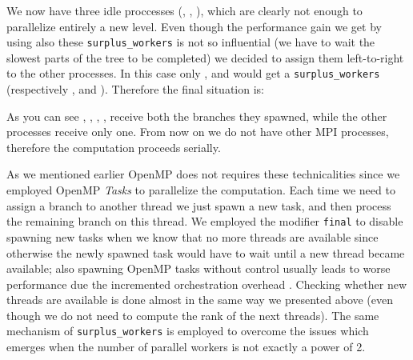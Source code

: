\documentclass{article}
\begin{document}
We now have three idle proccesses (, , ), which are
clearly not enough to parallelize entirely a new level. Even though the
performance gain we get by using also these \texttt{surplus\_workers} is not
so influential (we have to wait the slowest parts of the tree to be completed)
we decided to assign them left-to-right to the other processes. In this case
only ,  and  would get a \texttt{surplus\_workers}
(respectively ,  and ). Therefore the final situation
is:

\begin{figure}[H]
    \centering
\end{figure}

As you can see , , , ,  receive both the
branches they spawned, while the other processes receive only one. From now on
we do not have other MPI processes, therefore the computation proceeds serially.

As we mentioned earlier OpenMP does not requires these technicalities since we
employed OpenMP \emph{Tasks} to parallelize the computation. Each time we need
to assign a branch to another thread we just spawn a new task, and then process
the remaining branch on this thread. We employed the modifier \texttt{final}
to disable spawning new tasks when we know that no more threads are available
since otherwise the newly spawned task would have to wait until a new thread
became available; also spawning OpenMP tasks without control usually leads to
worse performance due the incremented orchestration overhead
\cite{hager2010introduction}. Checking whether new threads are available is done
almost in the same way we presented above (even though we do not need to compute
the rank of the next threads). The same mechanism of \texttt{surplus\_workers}
is employed to overcome the issues which emerges when the number of parallel
workers is not exactly a power of 2.
\end{document}
